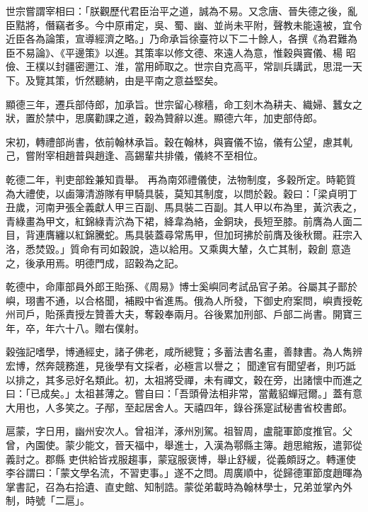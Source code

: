 \begin{pinyinscope}
 世宗嘗謂宰相曰：「朕觀歷代君臣治平之道，誠為不易。又念唐、晉失德之後，亂臣黠將，僭竊者多。今中原甫定，吳、蜀、幽、並尚未平附，聲教未能遠被，宜令近臣各為論策，宣導經濟之略。」乃命承旨徐臺符以下二十餘人，各撰《為君難為臣不易論》、《平邊策》以進。其策率以修文德、來遠人為意，惟穀與竇儀、楊
 昭儉、王樸以封疆密邇江、淮，當用師取之。世宗自克高平，常訓兵講武，思混一天下。及覽其策，忻然聽納，由是平南之意益堅矣。



 顯德三年，遷兵部侍郎，加承旨。世宗留心稼穡，命工刻木為耕夫、織婦、蠶女之狀，置於禁中，思廣勸課之道，穀為贊辭以進。顯德六年，加吏部侍郎。



 宋初，轉禮部尚書，依前翰林承旨。穀在翰林，與竇儀不協，儀有公望，慮其軋己，嘗附宰相趙普與趙逢、高錫輩共排儀，儀終不至相位。



 乾德二年，判吏部銓兼知貢舉。
 再為南郊禮儀使，法物制度，多穀所定。時範質為大禮使，以鹵簿清游隊有甲騎具裝，莫知其制度，以問於穀。穀曰：「梁貞明丁丑歲，河南尹張全義獻人甲三百副、馬具裝二百副。其人甲以布為里，黃泬表之，青綠畫為甲文，紅錦綠青泬為下裙，絳韋為絡，金銅玦，長短至膝。前膺為人面二目，背連膺纏以紅錦騰蛇。馬具裝蓋尋常馬甲，但加珂拂於前膺及後秋爾。莊宗入洛，悉焚毀。」質命有司如穀說，造以給用。又乘輿大輦，久亡其制，穀創
 意造之，後承用焉。明德門成，詔穀為之記。



 乾德中，命庫部員外郎王貽孫、《周易》博士奚嶼同考試品官子弟。谷屬其子鄑於嶼，珝書不通，以合格聞，補殿中省進馬。俄為人所發，下御史府案問，嶼責授乾州司戶，貽孫責授左贊善大夫，奪穀奉兩月。谷後累加刑部、戶部二尚書。開寶三年，卒，年六十八。贈右僕射。



 穀強記嗜學，博通經史，諸子佛老，咸所總覽；多蓄法書名畫，善隸書。為人雋辨宏博，然奔競務進，見後學有文採者，必極言以譽之；
 聞達官有聞望者，則巧詆以排之，其多忌好名類此。初，太祖將受禪，未有禪文，穀在旁，出諸懷中而進之曰：「已成矣。」太祖甚薄之。嘗自曰：「吾頭骨法相非常，當戴貂蟬冠爾。」蓋有意大用也，人多笑之。子邴，至起居舍人。天禧四年，錄谷孫寔試秘書省校書郎。



 扈蒙，字日用，幽州安次人。曾祖洋，涿州別駕。祖智周，盧龍軍節度推官。父曾，內園使。蒙少能文，晉天福中，舉進士，入漢為鄠縣主簿。趙思綰叛，遣郭從義討之。郡縣
 吏供給皆戎服趨事，蒙寇服褒博，舉止舒緩，從義頗訝之。轉運使李谷謂曰：「蒙文學名流，不習吏事。」遂不之問。周廣順中，從歸德軍節度趙暉為掌書記，召為右拾遺、直史館、知制誥。蒙從弟載時為翰林學士，兄弟並掌內外制，時號「二扈」。




\end{pinyinscope}
